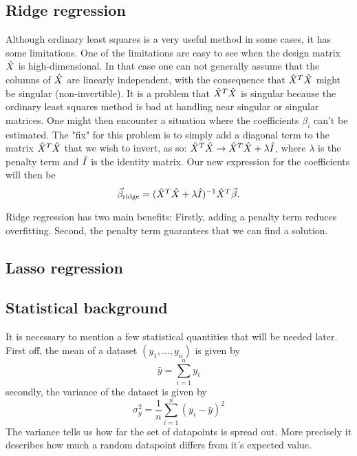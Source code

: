 \documentclass[a4paper,12pt]{article}
\begin{document}
\subsection{Ridge regression}
Although ordinary least squares is a very useful method in some cases, it has some limitations. One of the limitations are easy to see when the design matrix $\Hat{X}$ is high-dimensional. In that case one can not generally assume that the columns of $\Hat{X}$ are linearly independent, with the consequence that $\Hat{X}^T\Hat{X}$ might be singular (non-invertible). It is a problem that $\Hat{X}^T\Hat{X}$ is singular because the ordinary least squares method is bad at handling near singular or singular matrices. One might then encounter a situation where the coefficients $\beta_i$ can't be estimated.\newline
The "fix" for this problem is to simply add a diagonal term to the matrix $\Hat{X}^T\Hat{X}$ that we wish to invert, as so: $\Hat{X}^T\Hat{X} \rightarrow \Hat{X}^T\Hat{X} + \lambda \Hat{I}$, where $\lambda$ is the penalty term and $\Hat{I}$ is the identity matrix. Our new expression for the coefficients will then be
\begin{equation}
\vec{\beta}_{\text{ridge}}=(\hat{X}^T\hat{X}+\lambda \Hat{I})^{-1}\hat{X}^T\vec{\beta}.
\end{equation}



Ridge regression has two main benefits: Firstly, adding a penalty term reduces overfitting. Second, the penalty term guarantees that we can find a solution.


\subsection{Lasso regression}

\subsection{Statistical background}
It is necessary to mention a few statistical quantities that will be needed later. First off, the mean of a dataset $(y_1, ..., y_n)$ is given by
\begin{equation}
\bar{y}=\sum_{i=1}^n y_i
\end{equation}
secondly, the variance of the dataset is given by
\begin{equation}
\sigma_y^2=\frac{1}{n}\sum_{i=1}^n(y_i-\bar{y})^2
\end{equation}
The variance tells us how far the set of datapoints is spread out. More precisely it describes how much a random datapoint differs from it's expected value.\newline
\end{document}

